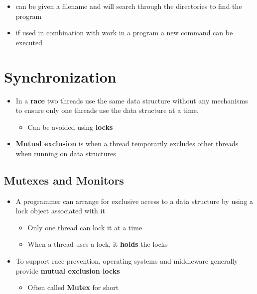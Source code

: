 \documentclass[11pt]{article}
\providecommand{\tightlist}{%
      \setlength{\itemsep}{0pt}\setlength{\parskip}{0pt}}
\begin{document}
\begin{itemize}
  \begin{itemize}
  \tightlist
  \item
    can be given a filename and will search through the directories to
    find the program
  \item
    if used in combination with work in a program a new command can be
    executed
  \end{itemize}
\end{itemize}

    \section{Synchronization}\label{synchronization}

\begin{itemize}
\tightlist
\item
  In a \textbf{race} two threads use the same data structure without any
  mechanisms to ensure only one threads use the data structure at a
  time.

  \begin{itemize}
  \tightlist
  \item
    Can be avoided using \textbf{locks}
  \end{itemize}
\item
  \textbf{Mutual exclusion} is when a thread temporarily excludes other
  threads when running on data structures
\end{itemize}

    \subsection{Mutexes and Monitors}\label{mutexes-and-monitors}

\begin{itemize}
\tightlist
\item
  A programmer can arrange for exclusive access to a data structure by
  using a lock object associated with it

  \begin{itemize}
  \tightlist
  \item
    Only one thread can lock it at a time
  \item
    When a thread uses a lock, it \textbf{holds} the locks
  \end{itemize}
\item
  To support race prevention, operating systems and middleware generally
  provide \textbf{mutual exclusion locks}

  \begin{itemize}
  \tightlist
  \item
    Often called \textbf{Mutex} for short
  \end{itemize}
\end{itemize}
\end{document}

